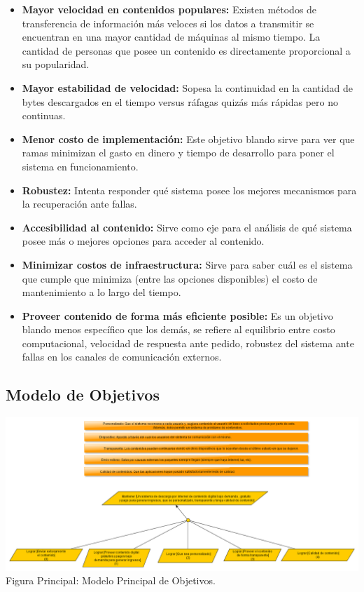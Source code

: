 \documentclass[11pt, a4paper, spanish]{article}
\begin{document}
	\begin{itemize}

	\item{ \textbf{ Mayor velocidad en contenidos populares:} Existen m\'etodos de transferencia de informaci\'on m\'as veloces si los datos a transmitir se 	
	encuentran en una mayor cantidad de m\'aquinas al mismo tiempo. La cantidad de personas que posee un contenido es directamente proporcional a su 
	popularidad.}

	\item{ \textbf{ Mayor estabilidad de velocidad:} Sopesa la continuidad en la cantidad de bytes descargados en el tiempo versus r\'afagas quiz\'as m\'as 
	r\'apidas pero no continuas.}

	\item{ \textbf{ Menor costo de implementaci\'on:} Este objetivo blando sirve para ver que ramas minimizan el gasto en dinero y tiempo de desarrollo 	
	para poner el sistema en funcionamiento. }

	\item{ \textbf{ Robustez:} Intenta responder qu\'e sistema posee los mejores mecanismos para la recuperaci\'on ante fallas.}
    
	\item{ \textbf{ Accesibilidad al contenido:} Sirve como eje para el an\'alisis de qu\'e sistema posee m\'as o mejores opciones para acceder al contenido.}

	\item{ \textbf{ Minimizar costos de infraestructura:} Sirve para saber cu\'al es el sistema que cumple que minimiza (entre las opciones disponibles) el 
	costo de mantenimiento a lo largo del tiempo.}

	\item{ \textbf{ Proveer contenido de forma m\'as eficiente posible:} Es un objetivo blando menos espec\'ifico que los dem\'as, se refiere al equilibrio entre 
	costo computacional, velocidad de respuesta ante pedido, robustez del sistema ante fallas en los canales de comunicaci\'on externos.}

	\end{itemize}

\newpage

\subsection{Modelo de Objetivos}

	\begin{center}
		\includegraphics[scale=0.35]{Diagramas/ModelodeObjetivosPrincipal.png}
		\small{Figura Principal: Modelo Principal de Objetivos.}
	\end{center}
\end{document}
